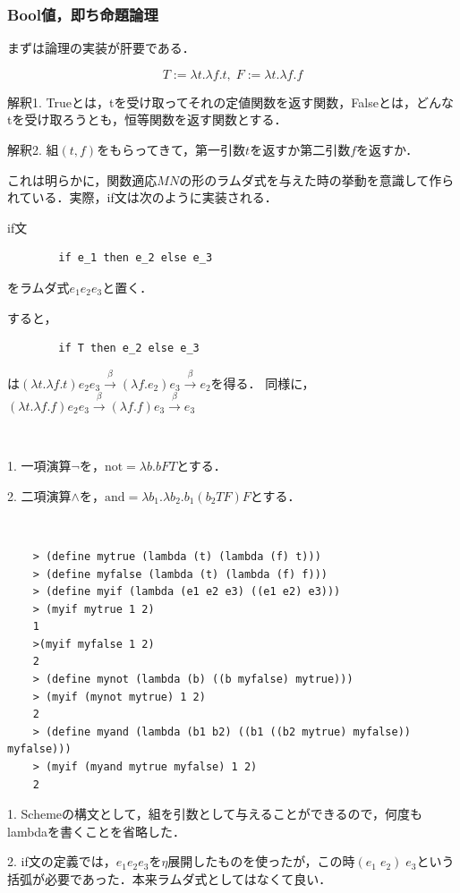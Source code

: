 \documentclass[uplatex, dvipdfmx]{jsreport}
\begin{document}
\subsubsection{Bool値，即ち命題論理}
まずは論理の実装が肝要である．

\begin{shadebox}\begin{definition}
    \[ T := \lambda t.\lambda f.t,\; F:= \lambda t.\lambda f.f \]

    解釈1. Trueとは，tを受け取ってそれの定値関数を返す関数，Falseとは，どんなtを受け取ろうとも，恒等関数を返す関数とする．
    
    解釈2. 組$(t,f)$をもらってきて，第一引数$t$を返すか第二引数$f$を返すか．
\end{definition}\end{shadebox}
これは明らかに，関数適応$MN$の形のラムダ式を与えた時の挙動を意識して作られている．実際，if文は次のように実装される．

\begin{shadebox}\begin{definition}[if sentence]
    if文
    \begin{lstlisting}
        if e_1 then e_2 else e_3
    \end{lstlisting}
    をラムダ式$e_1e_2e_3$と置く．
\end{definition}\end{shadebox}
すると，
\begin{lstlisting}
        if T then e_2 else e_3
\end{lstlisting}
は$(\lambda t.\lambda f.t)e_2e_3\xrightarrow{\beta}(\lambda f.e_2)e_3\xrightarrow{\beta}e_2$を得る．
同様に，$(\lambda t.\lambda f.f)e_2e_3\xrightarrow{\beta}(\lambda f.f)e_3\xrightarrow{\beta}e_3$

\begin{definition}　

    1. 一項演算$\lnot$を，$\mathrm{not}=\lambda b.bFT$とする．
    
    2. 二項演算$\land$を，$\mathrm{and}=\lambda b_1.\lambda b_2.b_1(b_2TF)F$とする．
\end{definition}

\begin{example}[Scheme]　

    \begin{lstlisting}
    > (define mytrue (lambda (t) (lambda (f) t)))
    > (define myfalse (lambda (t) (lambda (f) f)))
    > (define myif (lambda (e1 e2 e3) ((e1 e2) e3)))
    > (myif mytrue 1 2)
    1
    >(myif myfalse 1 2)
    2
    > (define mynot (lambda (b) ((b myfalse) mytrue)))
    > (myif (mynot mytrue) 1 2)
    2
    > (define myand (lambda (b1 b2) ((b1 ((b2 mytrue) myfalse)) myfalse)))
    > (myif (myand mytrue myfalse) 1 2)
    2
    \end{lstlisting}
    1. Schemeの構文として，組を引数として与えることができるので，何度もlambdaを書くことを省略した．

    2. if文の定義では，$e_1e_2e_3$を$\eta$展開したものを使ったが，この時$(e_1\;e_2)\;e_3$という括弧が必要であった．本来ラムダ式としてはなくて良い．
\end{example}
\end{document}
